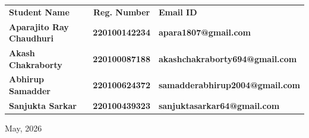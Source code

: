 \begin{center}

    \vspace{5mm}


    \projectFulfillment




    
\begin{table}[H]
\centering
\renewcommand{\arraystretch}{1.3}
    \begin{tabular}{lcl}
    \textbf{Student Name} & \textbf{Reg. Number} & \textbf{Email ID}  \\ 

    \textbf{Aparajito Ray Chaudhuri} & \textbf{220100142234} & \textbf{apara1807@gmail.com} \\ 
    
    \textbf{Akash Chakraborty} & \textbf{220100087188} & \textbf{akashchakraborty694@gmail.com} \\
    
    \textbf{Abhirup Samadder} & \textbf{220100624372} & \textbf{samadderabhirup2004@gmail.com} \\ 
    
    \textbf{Sanjukta Sarkar} & \textbf{220100439323} & \textbf{sanjuktasarkar64@gmail.com} \\
    \end{tabular}
\end{table}







    

    \universityDetailsTitlePage
    \vspace{-0.6cm}

    
    \begin{center}
        {\Large May, 2026 \par}
    \end{center}

    
\end{center}
